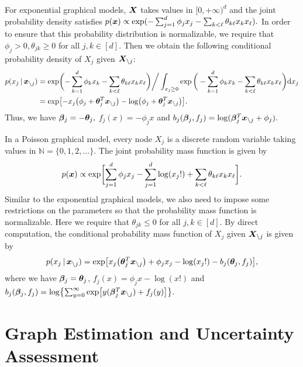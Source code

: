 \documentclass[twoside,11pt]{article}
\begin{document}
\vspace{5pt}
For exponential graphical models, $\bm{X}$  takes values in $[0,+\infty)^d$ and the joint probability density satisfies
$
p (\bm{x}) \propto \exp (   - \sum_{j =1}^d \phi_j x_j - \sum_{k<\ell } \theta_{k\ell} x_k x_\ell ) .
$
In order to ensure that  this probability distribution is normalizable, we require that $\phi_j >0, \theta_{jk} \geq 0$ for all $j,k\in [d].$ Then we obtain the following conditional probability density of $X_j$ given $\bm{X}_{\setminus j}$:
\begin{align*}
p ( x_j {\,|\,}  \bm{x}_{\setminus j}) &= \exp\biggl ( - \sum\limits_{k =1}^d \phi_k x_k- \sum\limits_{k<\ell} \theta_{k\ell} x_k x_\ell\biggr )  \bigg/ \int_{x_j\geq 0}  \exp\bigg ( - \sum\limits_{k   =1}^d \phi_k x_k  - \sum\limits_{k<\ell} \theta_{k\ell} x_k x_\ell\biggr ) {\mathrm{d}} x_j \\
&=  \exp \bigl[ - x_j\bigl( \phi_ j+ \bm{\theta}_{j}^T\bm{x}_{\setminus j}\bigr)- \log \bigl(\phi_j + \bm{\theta}_{j}^T\bm{x}_{\setminus j}\bigr)\bigr].
\end{align*}
Thus, we have  $\bm{\beta}_{j} = - \bm{\theta}_{j},$ $ f_j(x) = -\phi_j x$ and $b_j(\bm{\beta}_j,f_j) = \log (\bm{\beta}_j^T \bm{x}_{\setminus j}+ \phi_j).$

\vspace{5pt}
In a Poisson graphical model, every node $X_j$ is a discrete random variable  taking values in $\mathbb{N} = \{ 0,1,2,\ldots\}.$ The joint probability mass function is given by
$$
p(\bm{x}) \propto \exp\biggl [ \sum\limits_{j=1}^d \phi_j x_j  - \sum\limits_{j=1}^d \log (x_j!) + \sum\limits_{k<\ell } \theta_{k\ell } x_kx_ \ell\biggr ] .
$$
Similar to the  exponential graphical models, we also need to impose some restrictions on the parameters so that the probability mass function is normalizable. Here we require that $\theta_{jk} \leq 0$ for all $j,k \in [d].$ By direct computation, the    conditional probability mass function of $X_j$ given $\bm{X}_{\setminus j}$ is given by 
$$
p (x_j{\,|\,} \bm{x}_{\setminus j}) = \exp\bigl [  x_j \bigl(\bm{\theta}_{j} ^T \bm{x}_{\setminus j}\bigr) + \phi_j x _j- \log (x_j!)- b_j(\bm{\theta}_j, f_j)\bigr] ,
$$
where 
  we have  $\bm{\beta}_j = \bm{\theta}_{j}$, $f_j(x) = \phi_j x  - \log (x !)$ and $b_j(\bm{\beta}_j, f_j) = \log \bigl\{ \sum_{y=0}^{\infty} \exp\bigl[ y  (\bm{\beta}_j^T \bm{x}_{\setminus j} ) + f_j(y)\bigr] \bigr\}.$ 



\section{Graph Estimation and Uncertainty Assessment}\label{sec::methodology}
\end{document}
